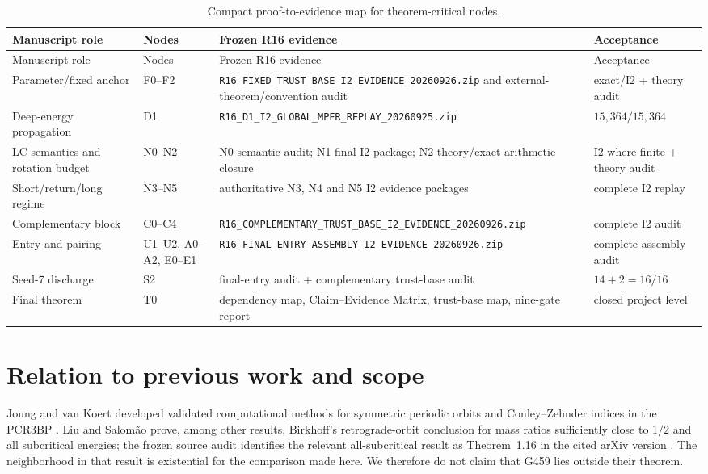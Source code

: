 \documentclass[11pt]{article}
\begin{document}
\begingroup\footnotesize\begin{longtable}{@{}>{\raggedright\arraybackslash}p{}>{\raggedright\arraybackslash}p{}>{\raggedright\arraybackslash}p{}>{\raggedright\arraybackslash}p{}@{}}
\caption{Compact proof-to-evidence map for theorem-critical nodes.}\label{tab:proof-evidence}\\
\toprule
Manuscript role & Nodes & Frozen R16 evidence & Acceptance \\
\midrule
\endfirsthead
\toprule
Manuscript role & Nodes & Frozen R16 evidence & Acceptance \\
\midrule
\endhead
Parameter/fixed anchor & F0--F2 & \nolinkurl{R16_FIXED_TRUST_BASE_I2_EVIDENCE_20260926.zip} and external-theorem/convention audit & exact/I2 + theory audit \\
Deep-energy propagation & D1 & \nolinkurl{R16_D1_I2_GLOBAL_MPFR_REPLAY_20260925.zip} & $15{,}364/15{,}364$ \\
LC semantics and rotation budget & N0--N2 & N0 semantic audit; N1 final I2 package; N2 theory/exact-arithmetic closure & I2 where finite + theory audit \\
Short/return/long regime & N3--N5 & authoritative N3, N4 and N5 I2 evidence packages & complete I2 replay \\
Complementary block & C0--C4 & \nolinkurl{R16_COMPLEMENTARY_TRUST_BASE_I2_EVIDENCE_20260926.zip} & complete I2 audit \\
Entry and pairing & U1--U2, A0--A2, E0--E1 & \nolinkurl{R16_FINAL_ENTRY_ASSEMBLY_I2_EVIDENCE_20260926.zip} & complete assembly audit \\
Seed-7 discharge & S2 & final-entry audit + complementary trust-base audit & $14+2=16/16$ \\
Final theorem & T0 & dependency map, Claim--Evidence Matrix, trust-base map, nine-gate report & closed project level \\
\bottomrule
\end{longtable}

\section{Relation to previous work and scope}
Joung and van Koert developed validated computational methods for symmetric periodic orbits and Conley--Zehnder indices in the PCR3BP \citep{JoungVanKoert2025}. Liu and Salom\~ao prove, among other results, Birkhoff's retrograde-orbit conclusion for mass ratios sufficiently close to $1/2$ and all subcritical energies; the frozen source audit identifies the relevant all-subcritical result as Theorem~1.16 in the cited arXiv version \citep{LiuSalomao2025}. The neighborhood in that result is existential for the comparison made here. We therefore do not claim that G459 lies outside their theorem.
\end{document}
